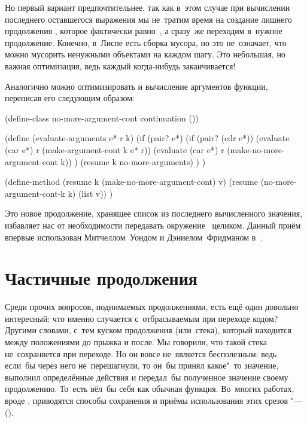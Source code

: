 Но первый вариант предпочтительнее, так как в~этом случае при вычислении
последнего оставшегося выражения мы не~тратим время на создание лишнего
продолжения , которое фактически равно~, а
сразу~же переходим в~нужное продолжение. Конечно, в~Лиспе есть сборка мусора, но
это не~означает, что можно мусорить ненужными объектами на каждом шагу. Это
небольшая, но важная оптимизация, ведь каждый  когда-нибудь
заканчивается!

Аналогично можно оптимизировать и вычисление аргументов функции, переписав его
следующим образом:

\begin{code:lisp}
(define-class no-more-argument-cont continuation ())

(define (evaluate-arguments e* r k)
  (if (pair? e*)
      (if (pair? (cdr e*))
          (evaluate (car e*) r (make-argument-cont k e* r))
          (evaluate (car e*) r (make-no-more-argument-cont k)) )
      (resume k no-more-arguments) ) )

(define-method (resume k (make-no-more-argument-cont) v)
  (resume (no-more-argument-cont-k k) (list v)) )
\end{code:lisp}

Это новое продолжение, хранящее список из последнего вычисленного значения,
избавляет нас от необходимости передавать окружение~ целиком. Данный приём
впервые использован Митчеллом~Уондом и Дэниелом~Фридманом в~\cite{wan80b}.


\section{Частичные продолжения}\label{escape/sect:partial}

Среди прочих вопросов, поднимаемых продолжениями, есть ещё один довольно
интересный: что именно случается с~отбрасываемым при переходе кодом? Другими
словами, с~тем куском продолжения (или~стека), который находится между
положениями до прыжка и после. Мы говорили, что такой  стека
не~сохраняется при переходе. Но он вовсе не~является бесполезным: ведь если~бы
через него не~перешагнули, то он~бы принял какое"~то значение, выполнил
определённые действия и передал~бы полученное значение своему продолжению.
То~есть вёл~бы себя как обычная функция. Во~многих работах, вроде
\cite{ffdm87,ff87,fel88,df90,hd90,qs91,mq94}, приводятся способы сохранения и
приёмы использования этих срезов "--- 
().

